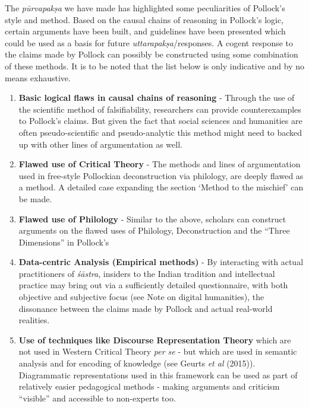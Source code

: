 The  {\sl pūrvapakṣa} we have made has highlighted some peculiarities of Pollock's style and method. Based on the causal chains of reasoning in Pollock's logic, certain arguments have been built, and guidelines have been presented which could be used as a basis for future {\sl uttarapakṣa}/responses. A cogent response to the claims made by Pollock can possibly be constructed using some combination of these methods. It is to be noted that the list below is only indicative and by no means exhaustive.
\begin{enumerate}
\item {\bf Basic logical flaws in causal chains of reasoning} - Through the use of the scientific method of falsifiability, researchers can provide counterexamples to Pollock's claims.  But given the fact that social sciences and humanities are often pseudo-scientific and pseudo-analytic this method might need to backed up with other lines of argumentation as well.

\item {\bf Flawed use of Critical Theory} - The methods and lines of argumentation used in free-style Pollockian deconstruction via philology, are deeply flawed as a method. A detailed case expanding the section `Method to the mischief' can be made. 

\item {\bf Flawed use of Philology} - Similar to the above, scholars can construct arguments on the flawed uses of Philology, Deconstruction and the ``Three Dimensions'' in Pollock's

\item {\bf Data-centric Analysis (Empirical methods)} - By interacting with actual practitioners of {\sl śāstra}, insiders to the Indian tradition and intellectual practice may bring out via a sufficiently detailed questionnaire, with both objective and subjective focus (see Note on digital humanities), the dissonance between the claims made by Pollock and  actual real-world realities.

\item {\bf Use of techniques like Discourse Representation Theory} which are not used in Western Critical Theory {\sl per se} - but which are used in semantic analysis and for encoding of knowledge (see Geurts {\sl et al} (2015)). Diagrammatic representations used in this framework can be used as part of relatively easier pedagogical methods - making arguments and criticism ``visible'' and accessible to non-experts too.


\end{enumerate}
